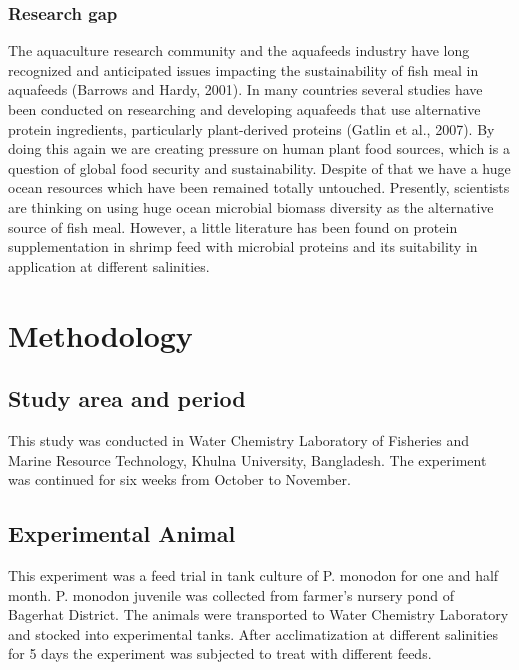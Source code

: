 \documentclass[
]{book}
\begin{document}
\hypertarget{research-gap}{%
\subsection{Research gap}\label{research-gap}}

The aquaculture research community and the aquafeeds industry have long
recognized and anticipated issues impacting the sustainability of fish
meal in aquafeeds (Barrows and Hardy, 2001). In many countries several
studies have been conducted on researching and developing aquafeeds that
use alternative protein ingredients, particularly plant-derived proteins
(Gatlin et al., 2007). By doing this again we are creating pressure on
human plant food sources, which is a question of global food security
and sustainability. Despite of that we have a huge ocean resources which
have been remained totally untouched. Presently, scientists are thinking
on using huge ocean microbial biomass diversity as the alternative
source of fish meal. However, a little literature has been found on
protein supplementation in shrimp feed with microbial proteins and its
suitability in application at different salinities.

\hypertarget{methodology}{%
\chapter{Methodology}\label{methodology}}

\hypertarget{study-area-and-period}{%
\section{Study area and period}\label{study-area-and-period}}

This study was conducted in Water Chemistry Laboratory of Fisheries and Marine Resource Technology, Khulna University, Bangladesh. The experiment was continued for six weeks from October to November.

\hypertarget{experimental-animal}{%
\section{Experimental Animal}\label{experimental-animal}}

This experiment was a feed trial in tank culture of P. monodon for one and half month. P. monodon juvenile was collected from farmer's nursery pond of Bagerhat District. The animals were transported to Water Chemistry Laboratory and stocked into experimental tanks. After acclimatization at different salinities for 5 days the experiment was subjected to treat with different feeds.
\end{document}
